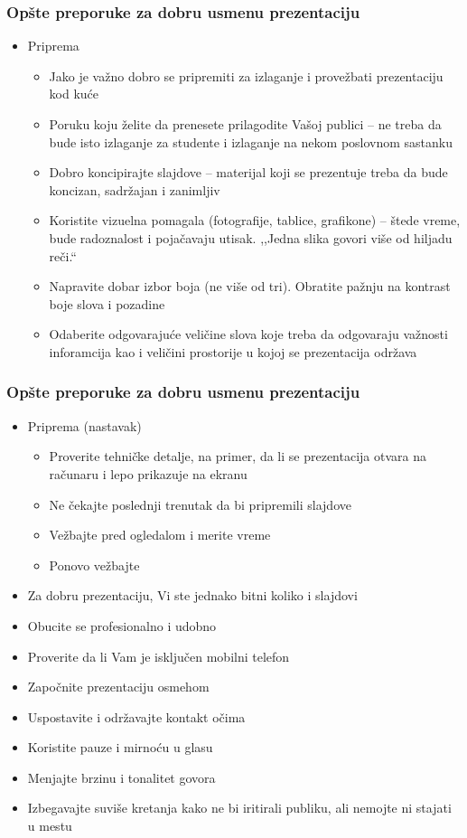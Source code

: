 \documentclass{beamer}
\begin{document}
\begin{frame}[fragile]\frametitle{Opšte preporuke za dobru usmenu prezentaciju}
	\begin{itemize}	
		\item Priprema
		\begin{itemize}
			\item Jako je važno dobro se pripremiti za izlaganje i provežbati prezentaciju kod kuće
			\item Poruku koju želite da prenesete prilagodite Vašoj publici -- ne treba da bude isto izlaganje za studente i izlaganje na nekom poslovnom sastanku
			\item Dobro koncipirajte slajdove -- materijal koji se prezentuje treba da bude koncizan,
			sadržajan i zanimljiv
			\item Koristite vizuelna pomagala (fotografije, tablice, grafikone) -- štede vreme, bude radoznalost i pojačavaju
			utisak. ,,Jedna slika govori više od hiljadu reči.``
			\item Napravite dobar izbor boja (ne više od tri). Obratite pažnju na
			kontrast boje slova i pozadine
			\item Odaberite odgovarajuće veličine slova koje treba da odgovaraju važnosti inforamcija kao i veličini prostorije u kojoj se prezentacija održava			
		\end{itemize}		
	\end{itemize}
\end{frame}

\begin{frame}[fragile]\frametitle{Opšte preporuke za dobru usmenu prezentaciju}
	\begin{itemize}	
		\item Priprema (nastavak)
		\begin{itemize}		
			\item Proverite tehničke detalje, na primer, da li se
			prezentacija otvara na računaru i lepo prikazuje na ekranu
			\item Ne čekajte poslednji trenutak da bi pripremili slajdove
			\item Vežbajte pred ogledalom i merite vreme
			\item Ponovo vežbajte
		\end{itemize}		
	        \item Za dobru prezentaciju, Vi ste jednako bitni koliko i slajdovi
	        \item Obucite se profesionalno i udobno
			\item Proverite da li Vam je isključen mobilni telefon
			\item Započnite prezentaciju osmehom
			\item Uspostavite i održavajte kontakt očima
			\item Koristite pauze i mirnoću u glasu
			\item Menjajte brzinu i tonalitet govora
			\item Izbegavajte suviše kretanja kako ne bi iritirali
			publiku, ali nemojte ni stajati u mestu
	\end{itemize}
\end{frame}
\end{document}
